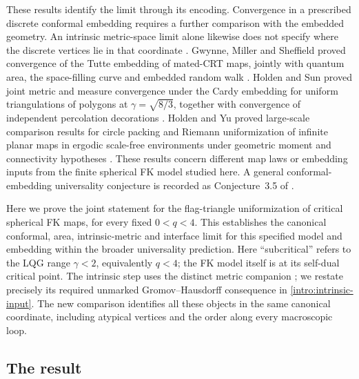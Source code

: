 These results identify the limit through its encoding. Convergence
in a prescribed discrete conformal embedding requires a further
comparison with the embedded geometry. An intrinsic metric-space
limit alone likewise does not specify where the discrete vertices
lie in that coordinate \citep{MillerSheffieldSphere,GHS-survey}.
Gwynne, Miller and Sheffield proved convergence of the Tutte embedding
of mated-CRT maps, jointly with quantum area, the space-filling curve
and embedded random walk
\citep[Theorem~1.1]{GwynneMillerSheffieldTutte}. Holden and Sun proved
joint metric and measure convergence under the Cardy embedding for
uniform triangulations of polygons at $\gamma=\sqrt{8/3}$, together
with convergence of independent percolation decorations
\citep[Theorems~1.3 and~1.6]{HS-Cardy}. Holden and Yu proved large-scale
comparison results for circle packing and Riemann uniformization of
infinite planar maps in ergodic scale-free environments under geometric
moment and connectivity hypotheses
\citep[Theorems~1.6--1.9]{HoldenYuUniformization}. These results concern
different map laws or embedding inputs from the finite spherical FK
model studied here. A general conformal-embedding universality
conjecture is recorded as Conjecture~3.5 of \citet{HS-survey}.

Here we prove the joint statement for the flag-triangle uniformization of
critical spherical FK maps, for every fixed $0<q<4$. This establishes the
canonical conformal, area, intrinsic-metric and interface limit for this
specified model and embedding within the broader universality prediction.
Here ``subcritical'' refers to the LQG range $\gamma<2$, equivalently
$q<4$; the FK model itself is at its self-dual critical point.
The intrinsic step uses the distinct metric companion
\citep[Theorem~1.1]{Intrinsic-input}; we restate precisely its required
unmarked Gromov--Hausdorff consequence in \cref{intro:intrinsic-input}.
The new comparison identifies all these objects in the same canonical
coordinate, including atypical vertices and the order along every
macroscopic loop.

\subsection{The result}

